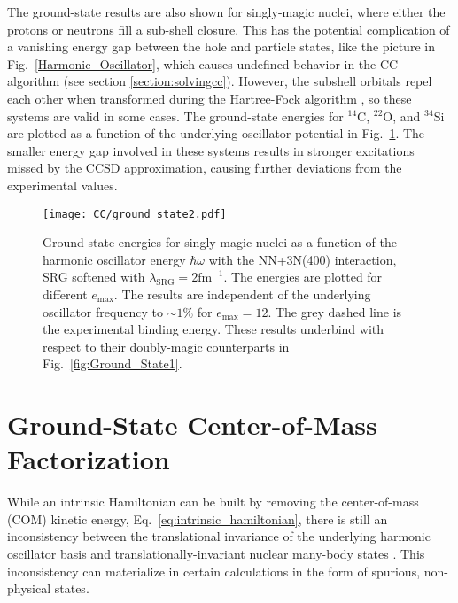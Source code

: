 \documentclass[thesis.tex]{subfiles}
\begin{document}
The ground-state results are also shown for singly-magic nuclei, where either the protons or neutrons fill a sub-shell closure.  This has the potential complication of a vanishing energy gap between the hole and particle states, like the picture in Fig.\ \ref{Harmonic_Oscillator}, which causes undefined behavior in the CC algorithm (see section \ref{section:solvingcc}).  However, the subshell orbitals repel each other when transformed during the Hartree-Fock algorithm \cite{LEVIT1999}, so these systems are valid in some cases.  The ground-state energies for ${}^{14}$C, ${}^{22}$O, and ${}^{34}$Si are plotted as a function of the underlying oscillator potential in Fig.\ \ref{fig:Ground_State2}.  The smaller energy gap involved in these systems results in stronger excitations missed by the CCSD approximation, causing further deviations from the experimental values.
\begin{figure}[h!]
  \centering
  \texttt{[image: CC/ground\_state2.pdf]}
  \caption{Ground-state energies for singly magic nuclei as a function of the harmonic oscillator energy $\hbar\omega$ with the NN+3N(400) interaction, SRG softened with $\lambda_{\mathrm{SRG}}=2\mathrm{fm}^{-1}$.  The energies are plotted for different $e_\mathrm{max}$.  The results are independent of the underlying oscillator frequency to $\sim 1\%$ for $e_\mathrm{max}=12$.  The grey dashed line is the experimental binding energy.  These results underbind with respect to their doubly-magic counterparts in Fig.\ \ref{fig:Ground_State1}.}
  \label{fig:Ground_State2}
\end{figure}

\section{Ground-State Center-of-Mass Factorization} \label{section:CoM}
While an intrinsic Hamiltonian can be built by removing the center-of-mass (COM) kinetic energy, Eq.\ \eqref{eq:intrinsic_hamiltonian}, there is still an inconsistency between the translational invariance of the underlying harmonic oscillator basis and translationally-invariant nuclear many-body states \cite{LIPKIN1958,GLOECKNER1974313}.  This inconsistency can materialize in certain calculations in the form of spurious, non-physical states.
\end{document}
